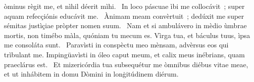 { }
{%
òminus règit me, et nìhil déerit mìhi. 
~In loco páscuae ìbi me collocávit~; super aquam refecçiónis educávit me. 
~Ànimam meam convèrtuit~; dedúxit me super sémitas justìçiae pròpter nomen suum. 
~Nam et si ambulávero in mèdio ùmbrae mortis, non timébo màla, quóniam tu mecum es. Vìrga tua, et báculus tuus, ìpsa me consoláta sunt. 
~Paravìsti in conspèctu meo mènsam, advèrsus eos qui trìbulant me. Impingüavìsti in óleo caput meum, et calix meus inébrians, quam praeclárus est. 
~Et mizericórdia tua subsequétur me òmnibus diébus vitae meae, et ut inhábitem in domu Dòmini in lonġitúdinem diérum. 
}
